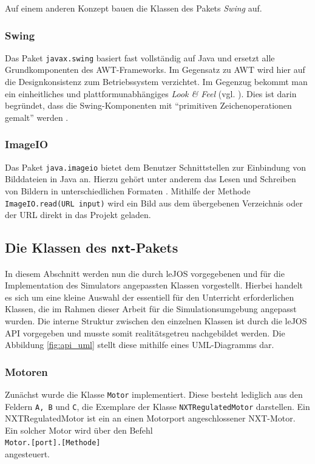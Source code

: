 \documentclass[paper=a4, DIV=calc, BCOR=12mm, twoside=on, onecolumn=on, open = right, titlepage =on, parskip =half-, headsepline = on, footsepline = off, chapterprefix = off, appendixprefix = on, fontsize = 12pt, numbers = noenddot, abstract = on]{scrbook}
\begin{document}
Auf einem anderen Konzept bauen die Klassen des Pakets \emph{Swing} auf. 

\subsubsection*{Swing}

Das Paket \texttt{javax.swing} basiert fast vollständig auf Java und ersetzt alle Grundkomponenten des AWT-Frameworks. Im Gegensatz zu AWT wird hier auf die Designkonsistenz zum Betriebssystem verzichtet. Im Gegenzug bekommt man ein einheitliches und plattformunabhängiges \emph{Look \& Feel} (vgl. \cite[S.279]{abts:15}). Dies ist darin begründet, dass die Swing-Komponenten mit "`primitiven Zeichenoperationen gemalt"' werden \cite[S.1018]{ullenboom:12}.


\subsubsection*{ImageIO}

Das Paket \texttt{java.imageio} bietet dem Benutzer Schnittstellen zur Einbindung von Bilddateien in Java an. Hierzu gehört unter anderem das Lesen und Schreiben von Bildern in unterschiedlichen Formaten \cite[S.1280]{ullenboom:12}. Mithilfe der Methode \texttt{ImageIO.read(URL input)} wird ein Bild aus dem übergebenen Verzeichnis oder der URL direkt in das Projekt geladen. 


\par \singlespacing
\subsection{Die Klassen des \texttt{nxt}-Pakets}
\label{sec:API}
\onehalfspacing
In diesem Abschnitt werden nun die durch leJOS vorgegebenen und für die Implementation des Simulators angepassten Klassen vorgestellt. Hierbei handelt es sich um eine kleine Auswahl der essentiell für den Unterricht erforderlichen Klassen, die im Rahmen dieser Arbeit für die Simulationsumgebung angepasst wurden. Die interne Struktur zwischen den einzelnen Klassen ist durch die leJOS API vorgegeben und musste somit realitätsgetreu nachgebildet werden. Die Abbildung \ref{fig:api_uml} stellt diese mithilfe eines UML-Diagramms dar.

\subsubsection{Motoren}
Zunächst wurde die Klasse \texttt{Motor} implementiert. Diese besteht lediglich aus den Feldern \texttt{A, B} und \texttt{C}, die Exemplare der Klasse \texttt{NXTRegulatedMo\-tor} darstellen. Ein NXTRegulatedMotor ist ein an einen Motorport angeschlossener NXT-Motor. Ein solcher Motor wird über den Befehl\\
\hspace*{2em} \texttt{Motor.[port].[Methode]}\\
angesteuert. 
\end{document}
